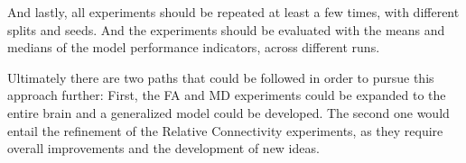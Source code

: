 And lastly, all experiments should be repeated at least a few times, with different splits and seeds. And the experiments should be evaluated with the means and medians of the model performance indicators, across different runs.\par
Ultimately there are two paths that could be followed in order to pursue this approach further: First, the \ac{FA} and \ac{MD} experiments could be expanded to the entire brain and a generalized model could be developed. The second one would entail the refinement of the Relative Connectivity experiments, as they require overall improvements and the development of new ideas.







